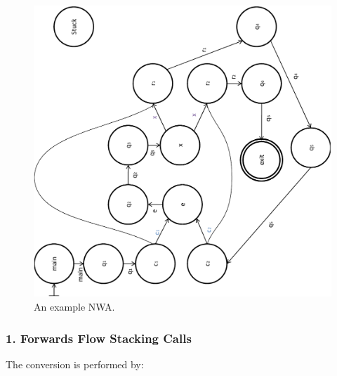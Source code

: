 \begin{figure}[htbp]
  \centering
    \includegraphics[width=12cm]{Figures/Figure23}
  \caption{An example NWA.}
  \label{Fig:NWAtoPDS1}
\end{figure}

\subsubsection{1. Forwards Flow Stacking Calls}

\noindent The conversion is performed by:

